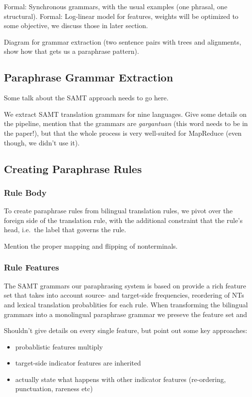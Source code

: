 \documentclass[11pt]{article}
\begin{document}
Formal: Synchronous grammars, with the usual examples (one phrasal, one
structural). Formal: Log-linear model for features, weights will be optimized to some
objective, we discuss those in later section.

Diagram for grammar extraction (two sentence pairs with trees and
alignments, show how that gets us a paraphrase pattern). 



\subsection{Paraphrase Grammar Extraction} \label{extraction}

Some talk about the SAMT approach needs to go here. 

We extract SAMT translation grammars for nine languages. Give some
details on the pipeline, mention that the grammars are
\emph{gargantuan} (this word needs to be in the paper!), but that the
whole process is very well-suited for MapReduce (even though, we
didn't use it).

\subsection{Creating Paraphrase Rules} \label{rule_creation}

\subsubsection{Rule Body} \label{rule_body}

To create paraphrase rules from bilingual translation rules, we pivot
over the foreign side of the translation rule, with the additional
constraint that the rule's head, i.e.\ the label that governs the
rule.

Mention the proper mapping and flipping of nonterminals.

\subsubsection{Rule Features} \label{rule_features}

The SAMT grammars our paraphrasing system is based on provide a rich
feature set that takes into account source- and target-side
frequencies, reordering of NTs and lexical translation probablities
for each rule. When transforming the bilingual grammars into a
monolingual paraphrase grammar we preseve the feature set and

Shouldn't give details on every single feature, but point out some key
approaches:
\begin{itemize}
\item probablistic features multiply 
\item target-side indicator features are inherited
\item actually state what happens with other indicator features
  (re-ordering, punctuation, rareness etc)
\end{itemize}
\end{document}
